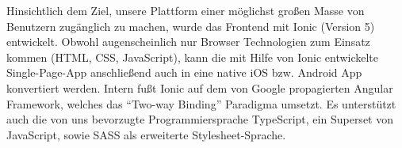\documentclass{article}
\begin{document}
Hinsichtlich dem Ziel, unsere Plattform einer möglichst großen Masse von Benutzern zugänglich zu machen, wurde das Frontend mit Ionic (Version 5) entwickelt. Obwohl augenscheinlich nur Browser Technologien zum Einsatz kommen (HTML, CSS, JavaScript), kann die mit Hilfe von Ionic entwickelte Single-Page-App anschließend auch in eine native iOS bzw. Android App konvertiert werden. Intern fußt Ionic auf dem von Google propagierten Angular Framework, welches das \enquote{Two-way Binding} Paradigma umsetzt. Es unterstützt auch die von uns bevorzugte Programmiersprache TypeScript, ein Superset von JavaScript, sowie SASS als erweiterte Stylesheet-Sprache. 







\end{document}
